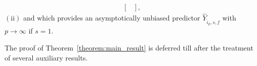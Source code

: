 \begin{thm}
\begin{align}
\begin{bmatrix}
        \end{bmatrix},
    \end{align}
    $\mathrm{(ii)}$ and which provides an asymptotically unbiased predictor $\widehat{Y}_{\hat{i}_p,s,f}$ with $p\rightarrow\infty$ if $s=1$.
\end{thm}
The proof of Theorem~\ref{theorem:main_result} is deferred till after the treatment of several auxiliary results.
